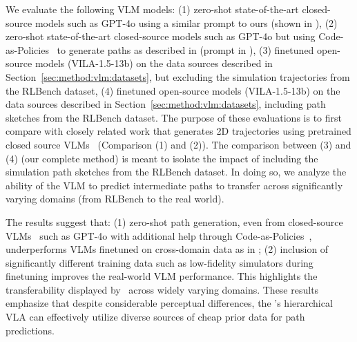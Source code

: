 We evaluate the following VLM models: (1) zero-shot state-of-the-art closed-source models such as GPT-4o using a similar prompt to ours (shown in ), (2) zero-shot state-of-the-art closed-source models such as GPT-4o but using Code-as-Policies~\citep{liang2023code} to generate paths as described in \citet{gu2023rttrajectory} (prompt in ),
(3) finetuned open-source models (VILA-1.5-13b) on the data sources described in Section~\ref{sec:method:vlm:datasets}, but excluding the simulation trajectories from the RLBench dataset, (4) finetuned open-source models (VILA-1.5-13b) on the data sources described in Section~\ref{sec:method:vlm:datasets}, including path sketches from the RLBench dataset. The purpose of these evaluations is to first compare with closely related work that generates 2D trajectories using pretrained closed source VLMs~\cite{gu2023rttrajectory} (Comparison (1) and (2)). 
The comparison between (3) and (4) (our complete method) is meant to isolate the impact of including the simulation path sketches from the RLBench dataset. In doing so, we analyze the ability of the VLM to predict intermediate paths to transfer across significantly varying domains (from RLBench to the real world). 

The results suggest that: (1) zero-shot path generation, even from closed-source VLMs~\cite{gu2023rttrajectory} such as GPT-4o with additional help through Code-as-Policies~\citep{liang2023code}, underperforms VLMs finetuned on cross-domain data as in \method; (2) inclusion of significantly different training data such as low-fidelity simulators during finetuning improves the real-world VLM performance. This highlights the transferability displayed by \method\ across widely varying domains. These results emphasize that despite considerable perceptual differences, the \method's hierarchical VLA can effectively utilize diverse sources of cheap prior data for path predictions. 







